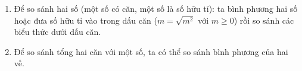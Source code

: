 \begin{enumerate}
\item Để so sánh hai số (một số có căn, một số là số hữu tỉ): ta bình phương hai số hoặc đưa số hữu tỉ vào trong dấu căn ($m = \sqrt{m^2}$ với $m \ge 0$) rồi so sánh các biểu thức dưới dấu căn.
\item Để so sánh tổng hai căn với một số, ta có thể so sánh bình phương của hai vế.
\end{enumerate}
